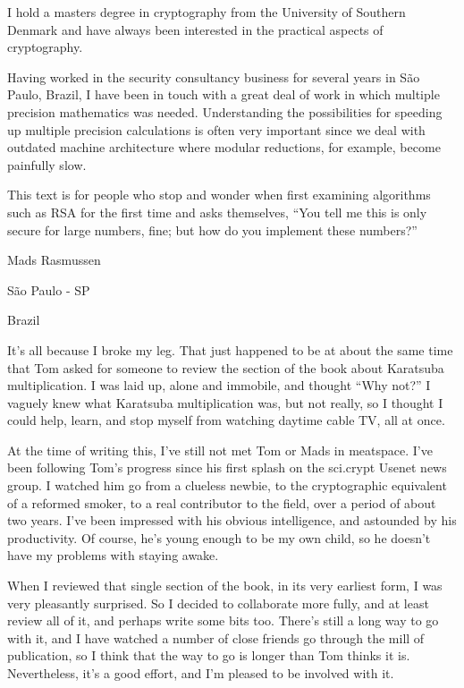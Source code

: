 \documentclass[b5paper]{book}
\begin{document}
I hold a masters degree in cryptography from the University of Southern Denmark and have always been interested in the 
practical aspects of cryptography. 

Having worked in the security consultancy business for several years in S\~{a}o Paulo, Brazil, I have been in touch with a 
great deal of work in which multiple precision mathematics was needed. Understanding the possibilities for speeding up 
multiple precision calculations is often very important since we deal with outdated machine architecture where modular 
reductions, for example, become painfully slow.

This text is for people who stop and wonder when first examining algorithms such as RSA for the first time and asks 
themselves, ``You tell me this is only secure for large numbers, fine; but how do you implement these numbers?''

\begin{flushright}
Mads Rasmussen

S\~{a}o Paulo - SP

Brazil
\end{flushright}

\newpage
It's all because I broke my leg. That just happened to be at about the same time that Tom asked for someone to review the section of the book about 
Karatsuba multiplication. I was laid up, alone and immobile, and thought ``Why not?'' I vaguely knew what Karatsuba multiplication was, but not 
really, so I thought I could help, learn, and stop myself from watching daytime cable TV, all at once.

At the time of writing this, I've still not met Tom or Mads in meatspace. I've been following Tom's progress since his first splash on the 
sci.crypt Usenet news group. I watched him go from a clueless newbie, to the cryptographic equivalent of a reformed smoker, to a real
contributor to the field, over a period of about two years. I've been impressed with his obvious intelligence, and astounded by his productivity. 
Of course, he's young enough to be my own child, so he doesn't have my problems with staying awake.

When I reviewed that single section of the book, in its very earliest form, I was very pleasantly surprised. So I decided to collaborate more fully, 
and at least review all of it, and perhaps write some bits too. There's still a long way to go with it, and I have watched a number of close 
friends go through the mill of publication, so I think that the way to go is longer than Tom thinks it is. Nevertheless, it's a good effort, 
and I'm pleased to be involved with it.
\end{document}
